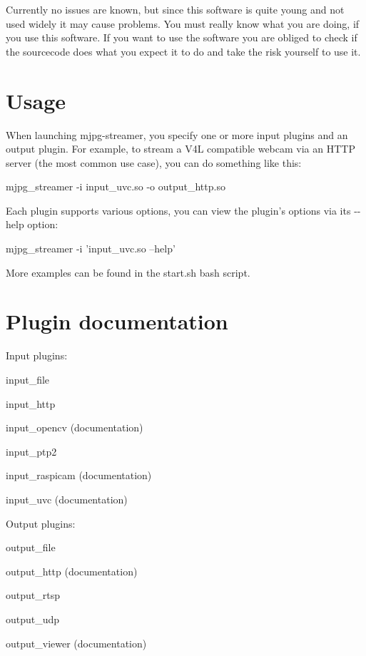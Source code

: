 Currently no issues are known, but since this software is quite young and not used widely it may cause problems. You must really know what you are doing, if you use this software. If you want to use the software you are obliged to check if the sourcecode does what you expect it to do and take the risk yourself to use it.

\section*{Usage }

When launching mjpg-\/streamer, you specify one or more input plugins and an output plugin. For example, to stream a V4\+L compatible webcam via an H\+T\+T\+P server (the most common use case), you can do something like this\+: \begin{DoxyVerb}mjpg_streamer -i input_uvc.so -o output_http.so
\end{DoxyVerb}


Each plugin supports various options, you can view the plugin's options via its {\ttfamily -\/-\/help} option\+: \begin{DoxyVerb}mjpg_streamer -i 'input_uvc.so --help'
\end{DoxyVerb}


More examples can be found in the start.\+sh bash script.

\section*{Plugin documentation }

Input plugins\+:


\begin{DoxyItemize}
\item input\+\_\+file
\item input\+\_\+http
\item input\+\_\+opencv (documentation)
\item input\+\_\+ptp2
\item input\+\_\+raspicam (documentation)
\item input\+\_\+uvc (documentation)
\end{DoxyItemize}

Output plugins\+:


\begin{DoxyItemize}
\item output\+\_\+file
\item output\+\_\+http (documentation)
\item output\+\_\+rtsp
\item output\+\_\+udp
\item output\+\_\+viewer (documentation) 
\end{DoxyItemize}